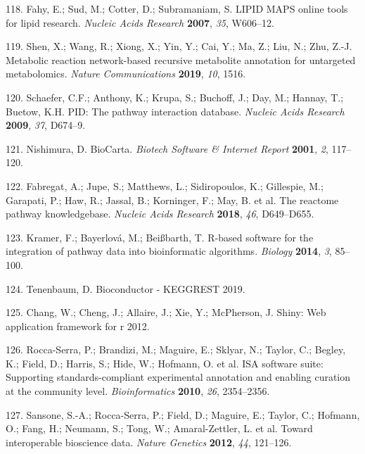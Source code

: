 \documentclass[]{article}
\begin{document}
\leavevmode\hypertarget{ref-fahy_2007}{}%
118. Fahy, E.; Sud, M.; Cotter, D.; Subramaniam, S. LIPID MAPS online tools for lipid research. \emph{Nucleic Acids Research} \textbf{2007}, \emph{35}, W606--12.

\leavevmode\hypertarget{ref-shen_2019}{}%
119. Shen, X.; Wang, R.; Xiong, X.; Yin, Y.; Cai, Y.; Ma, Z.; Liu, N.; Zhu, Z.-J. Metabolic reaction network-based recursive metabolite annotation for untargeted metabolomics. \emph{Nature Communications} \textbf{2019}, \emph{10}, 1516.

\leavevmode\hypertarget{ref-schaefer_2009}{}%
120. Schaefer, C.F.; Anthony, K.; Krupa, S.; Buchoff, J.; Day, M.; Hannay, T.; Buetow, K.H. PID: The pathway interaction database. \emph{Nucleic Acids Research} \textbf{2009}, \emph{37}, D674--9.

\leavevmode\hypertarget{ref-nishimura_2001}{}%
121. Nishimura, D. BioCarta. \emph{Biotech Software \& Internet Report} \textbf{2001}, \emph{2}, 117--120.

\leavevmode\hypertarget{ref-fabregat_2018}{}%
122. Fabregat, A.; Jupe, S.; Matthews, L.; Sidiropoulos, K.; Gillespie, M.; Garapati, P.; Haw, R.; Jassal, B.; Korninger, F.; May, B. et al. The reactome pathway knowledgebase. \emph{Nucleic Acids Research} \textbf{2018}, \emph{46}, D649--D655.

\leavevmode\hypertarget{ref-kramer_2014}{}%
123. Kramer, F.; Bayerlová, M.; Beißbarth, T. R-based software for the integration of pathway data into bioinformatic algorithms. \emph{Biology} \textbf{2014}, \emph{3}, 85--100.

\leavevmode\hypertarget{ref-tenenbaum_website_2019}{}%
124. Tenenbaum, D. Bioconductor - KEGGREST 2019.

\leavevmode\hypertarget{ref-chang_website_2012}{}%
125. Chang, W.; Cheng, J.; Allaire, J.; Xie, Y.; McPherson, J. Shiny: Web application framework for r 2012.

\leavevmode\hypertarget{ref-roccaserra_2010}{}%
126. Rocca-Serra, P.; Brandizi, M.; Maguire, E.; Sklyar, N.; Taylor, C.; Begley, K.; Field, D.; Harris, S.; Hide, W.; Hofmann, O. et al. ISA software suite: Supporting standards-compliant experimental annotation and enabling curation at the community level. \emph{Bioinformatics} \textbf{2010}, \emph{26}, 2354--2356.

\leavevmode\hypertarget{ref-sansone_2012}{}%
127. Sansone, S.-A.; Rocca-Serra, P.; Field, D.; Maguire, E.; Taylor, C.; Hofmann, O.; Fang, H.; Neumann, S.; Tong, W.; Amaral-Zettler, L. et al. Toward interoperable bioscience data. \emph{Nature Genetics} \textbf{2012}, \emph{44}, 121--126.
\end{document}
